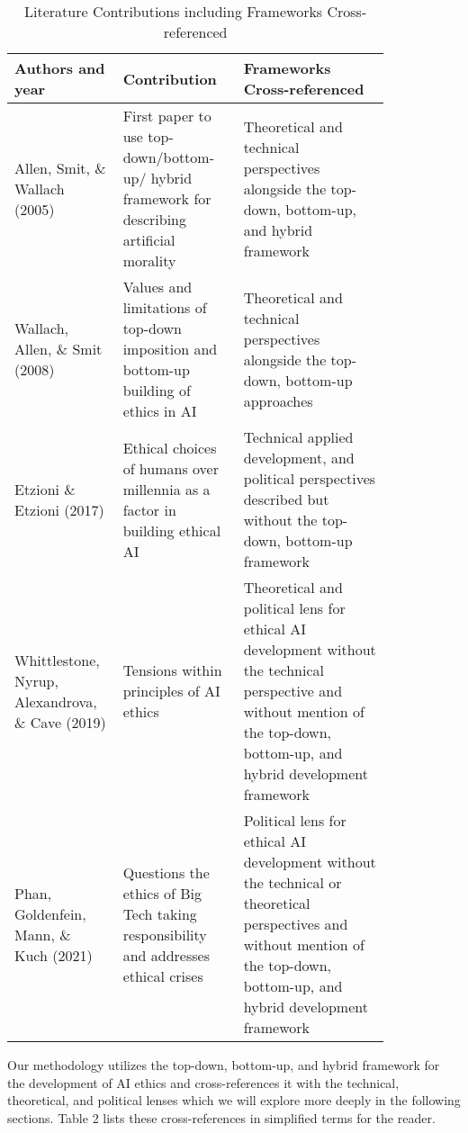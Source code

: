 \documentclass{svproc}
\begin{document}
\begin{table}
  \caption{Literature Contributions including Frameworks Cross-referenced 
}  
  \setlength{\tabcolsep}{8pt}
  \label{tab:princ}
  \begin{tabular}{p{0.2\linewidth} p{0.28\linewidth} p{0.35\linewidth}}
    
    \hline
    Authors and year&Contribution&Frameworks Cross-referenced\\
    \hline
   
     Allen, Smit, \& Wallach (2005) & First paper to use top-down/bottom-up/
hybrid framework for describing artificial morality 

& Theoretical and technical perspectives alongside the top-down, bottom-up, and hybrid framework\\
\hline
    Wallach, Allen, \& Smit (2008) & Values and limitations of top-down imposition and bottom-up building of ethics in AI 

&Theoretical and technical perspectives alongside the top-down, bottom-up approaches
\\
\hline
    Etzioni \& Etzioni (2017)
&Ethical choices of humans over millennia as a factor in building ethical AI&Technical applied development, and political perspectives described but without the top-down, bottom-up framework\\
\hline
    Whittlestone, Nyrup, Alexandrova, \& Cave (2019) & Tensions within principles of AI ethics& Theoretical and political lens for ethical AI development without the technical perspective and without mention of the top-down, bottom-up, and hybrid development framework\\
\hline
    Phan, Goldenfein, Mann, \& Kuch (2021)&Questions the ethics of Big Tech taking responsibility and addresses ethical crises& Political lens for ethical AI development without the technical or theoretical perspectives and without mention of the top-down, bottom-up, and hybrid development framework\\
    
  \hline
 
\end{tabular}
\end{table}

Our methodology utilizes the top-down, bottom-up, and hybrid framework for the development of AI ethics and cross-references it with the technical, theoretical, and political lenses which we will explore more deeply in the following sections. Table 2 lists these cross-references in simplified terms for the reader. 
\end{document}
